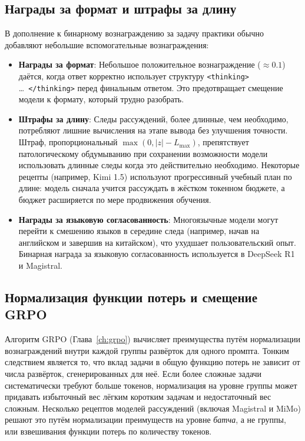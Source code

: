 \subsection{Награды за формат и штрафы за длину}
\label{subsec:format-rewards}

В дополнение к бинарному вознаграждению за задачу практики обычно добавляют
небольшие вспомогательные вознаграждения:

\begin{itemize}[leftmargin=*]
\item \textbf{Награды за формат}: Небольшое положительное вознаграждение ($\approx 0.1$)
  даётся, когда ответ корректно использует структуру \texttt{<thinking>}
  \ldots\ \texttt{</thinking>} перед финальным ответом. Это предотвращает
  смещение модели к формату, который трудно разобрать.

\item \textbf{Штрафы за длину}: Следы рассуждений, более длинные, чем
  необходимо, потребляют лишние вычисления на этапе вывода без улучшения точности.
  Штраф, пропорциональный $\max(0, |z| - L_{\max})$, препятствует
  патологическому обдумыванию при сохранении
  возможности модели использовать длинные следы когда это действительно необходимо. Некоторые
  рецепты (например, Kimi 1.5) используют прогрессивный учебный план по длине:
  модель сначала учится рассуждать в жёстком токенном бюджете, а
  бюджет расширяется по мере продвижения обучения.

\item \textbf{Награды за языковую согласованность}: Многоязычные модели могут
  перейти к смешению языков в середине следа (например, начав на английском
  и завершив на китайском), что ухудшает пользовательский опыт. Бинарная
  награда за языковую согласованность используется в DeepSeek R1 и Magistral.
\end{itemize}

\subsection{Нормализация функции потерь и смещение GRPO}
\label{subsec:loss-norm}

Алгоритм GRPO (Глава~\ref{ch:grpo}) вычисляет преимущества путём
нормализации вознаграждений внутри каждой группы развёрток для одного
промпта. Тонким следствием является то, что вклад задачи в
общую функцию потерь не зависит от числа развёрток, сгенерированных
для неё. Если более сложные задачи систематически требуют больше токенов,
нормализация на уровне группы может придавать избыточный вес лёгким коротким задачам
и недостаточный вес сложным. Несколько рецептов моделей
рассуждений (включая Magistral и MiMo) решают это путём нормализации преимуществ
на уровне \emph{батча}, а не группы, или взвешивания функции потерь
по количеству токенов.

